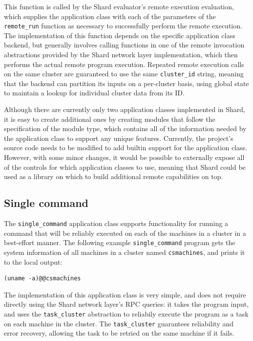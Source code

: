 \documentclass[oneside]{report}
\begin{document}
This function is called by the Shard evaluator's remote execution evaluation, which supplies the application class with each of the parameters of the \texttt{remote\_run} function as necessary to successfully perform the remote execution.
The implementation of this function depends on the specific application class backend, but generally involves calling functions in one of the remote invocation abstractions provided by the Shard network layer implementation, which then performs the actual remote program execution.
Repeated remote execution calls on the same cluster are guaranteed to use the same \texttt{cluster\_id} string, meaning that the backend can partition its inputs on a per-cluster basis, using global state to maintain a lookup for individual cluster data from its ID.

Although there are currently only two application classes implemented in Shard, it is easy to create additional ones by creating modules that follow the specification of the module type, which contains all of the information needed by the application class to support any unique features.
Currently, the project's source code needs to be modified to add builtin support for the application class. However, with some minor changes, it would be possible to externally expose all of the controls for which application classes to use, meaning that Shard could be used as a library on which to build additional remote capabilities on top.

\subsection{Single command}

\begin{sloppypar}
  The \texttt{single\_command} application class supports functionality for running a command that will be reliably executed on each of the machines in a cluster in a best-effort manner. The following example \texttt{single\_command} program gets the system information of all machines in a cluster named \texttt{csmachines}, and prints it to the local output:
\end{sloppypar}

\begin{minipage}[c]{\textwidth-15pt}
  \begin{lstlisting}
(uname -a)@@csmachines 
\end{lstlisting}
  \smallskip
\end{minipage}

\begin{sloppypar}
  The implementation of this application class is very simple, and does not require directly using the Shard network layer's RPC queries: it takes the program input, and uses the \texttt{task\_cluster} abstraction to reliabily execute the program as a task on each machine in the cluster.
  The \texttt{task\_cluster} guarantees reliability and error recovery, allowing the task to be retried on the same machine if it fails.
\end{sloppypar}
\end{document}
